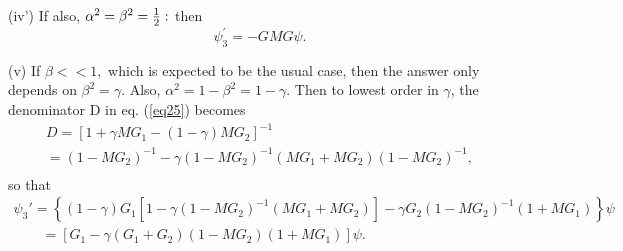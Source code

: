 \noindent
(iv') If also, $\alpha ^{2} = \beta ^{2} = {\textstyle{{1} \over {2}}}:$ then
\begin{equation}
\label{eq29}
\psi _{3} ^{\prime}  = - GMG\psi .
\end{equation}





\noindent
(v) If $\beta < < 1,$ which is expected to be the usual case, then the answer
only depends on $\beta ^{2} = \gamma .$ Also, $\alpha ^{2} = 1 - \beta ^{2}
= 1 - \gamma .$ Then to lowest order in $\gamma $, the denominator D in eq.
(\ref{eq25}) becomes
\begin{equation}
\label{eq30}
\begin{array}{l}
 D = [1 + \gamma MG_{1} - (1 - \gamma )MG_{2} ]^{ - 1} \\
 = (1 - MG_{2} )^{ - 1} - \gamma (1 - MG_{2} )^{ - 1}(MG_{1} + MG_{2} )(1 -
MG_{2} )^{ - 1}, \\
 \end{array}
\end{equation}
so that
\begin{equation}
\label{eq31}
\begin{array}{l}
\psi_3'=\left\{
(1-\gamma)G_1[1-\gamma (1-MG_2)^{-1}(MG_1+MG_2)]-\gamma G_2(1-MG_2)^{-1}(1+MG_1) \right\} \psi
 \\
\qquad =\left[G_1  -\gamma (G_1+G_2)(1-MG_2)(1+MG_1)\right] \psi .
 \end{array}
\end{equation}





